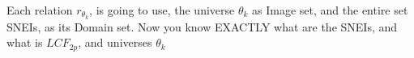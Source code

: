 		\noindent
		Each relation $r_{\theta_{k}}$, is going to use, the universe $\theta_{k}$ as Image set, and the entire set SNEIs, as its Domain set. Now you know EXACTLY what are the SNEIs, and what is $LCF_{2p}$, and universes $\theta_{k}$
		\\\\
		
		


\newpage